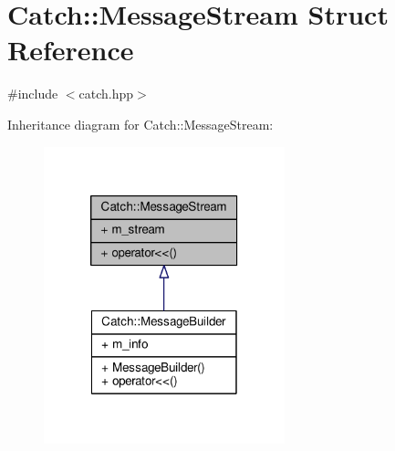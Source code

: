 \hypertarget{struct_catch_1_1_message_stream}{\section{Catch\-:\-:Message\-Stream Struct Reference}
\label{struct_catch_1_1_message_stream}
}


{\ttfamily \#include $<$catch.\-hpp$>$}



Inheritance diagram for Catch\-:\-:Message\-Stream\-:
\nopagebreak
\begin{figure}[H]
\begin{center}
\leavevmode
\includegraphics[width=198pt]{struct_catch_1_1_message_stream__inherit__graph}
\end{center}
\end{figure}


